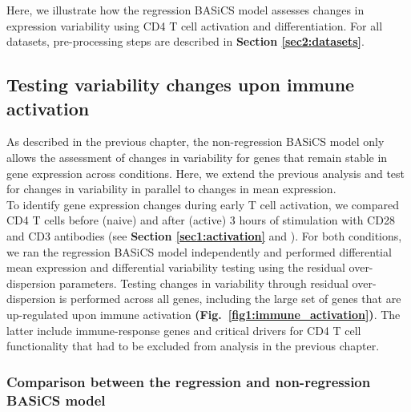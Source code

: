 Here, we illustrate how the regression BASiCS model assesses changes in expression variability using CD4\plus{} T cell activation and differentiation. For all datasets, pre-processing steps are described in \textbf{Section \ref{sec2:datasets}}. 

\subsection{Testing variability changes upon immune activation}
\label{sec2:immune_activation}

As described in the previous chapter, the non-regression BASiCS model only allows the assessment of changes in variability for genes that remain stable in gene expression across conditions. Here, we extend the previous analysis and test for changes in variability in parallel to changes in mean expression. \\

To identify gene expression changes during early T cell activation, we compared CD4\plus{} T cells before (naive) and after (active) 3 hours of stimulation with CD28 and CD3\textepsilon{} antibodies (see \textbf{Section \ref{sec1:activation}} and \citep{Martinez-jimenez2017}). For both conditions, we ran the regression BASiCS model independently and performed differential mean expression and differential variability testing using the residual over-dispersion parameters. Testing changes in variability through residual over-dispersion is performed across all genes, including the large set of genes that are up-regulated upon immune activation \textbf{(Fig.~\ref{fig1:immune_activation})}. The latter include immune-response genes and critical drivers for CD4\plus{} T cell functionality that had to be excluded from analysis in the previous chapter.

\subsubsection{Comparison between the regression and non-regression BASiCS model}

